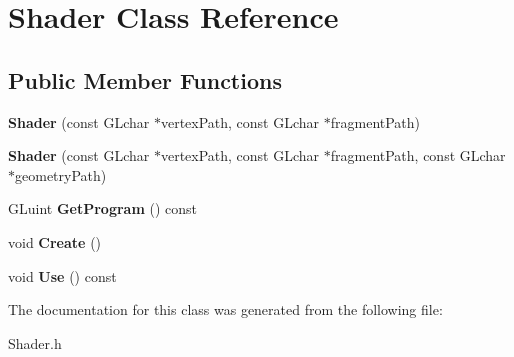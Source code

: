 \hypertarget{class_shader}{}\section{Shader Class Reference}
\label{class_shader}
\subsection*{Public Member Functions}
\begin{DoxyCompactItemize}
\item 
\hypertarget{class_shader_a03421a8419cdad4b84cf58ecdb156879}{}{\bfseries Shader} (const G\+Lchar $\ast$vertex\+Path, const G\+Lchar $\ast$fragment\+Path)\label{class_shader_a03421a8419cdad4b84cf58ecdb156879}

\item 
\hypertarget{class_shader_a764dce935b63a5ba4add880af9e102fa}{}{\bfseries Shader} (const G\+Lchar $\ast$vertex\+Path, const G\+Lchar $\ast$fragment\+Path, const G\+Lchar $\ast$geometry\+Path)\label{class_shader_a764dce935b63a5ba4add880af9e102fa}

\item 
\hypertarget{class_shader_ac7d8eeb6d2a6215b73f168906a094e15}{}G\+Luint {\bfseries Get\+Program} () const \label{class_shader_ac7d8eeb6d2a6215b73f168906a094e15}

\item 
\hypertarget{class_shader_ae22f06df368cebeb2e96173d5a6489d0}{}void {\bfseries Create} ()\label{class_shader_ae22f06df368cebeb2e96173d5a6489d0}

\item 
\hypertarget{class_shader_a65e20a174801bb1e074356c3eed43a37}{}void {\bfseries Use} () const \label{class_shader_a65e20a174801bb1e074356c3eed43a37}

\end{DoxyCompactItemize}


The documentation for this class was generated from the following file\+:\begin{DoxyCompactItemize}
\item 
Shader.\+h\end{DoxyCompactItemize}
